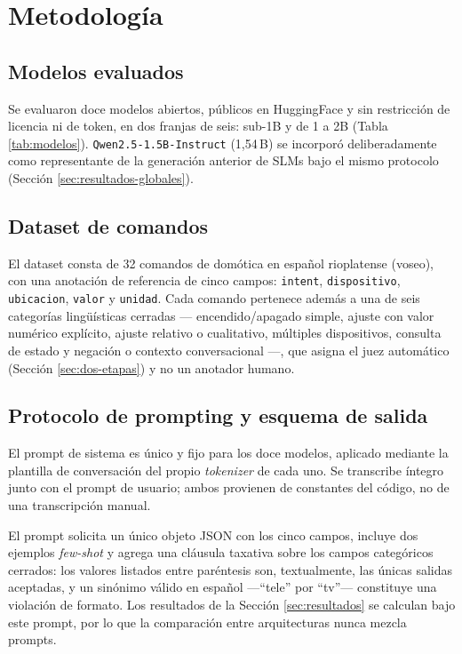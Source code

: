 \section{Metodología}

\subsection{Modelos evaluados}



Se evaluaron doce modelos abiertos, públicos en HuggingFace y sin
restricción de licencia ni de token, en dos franjas de seis: sub-1B y de 1
a 2B (Tabla
\ref{tab:modelos}). \texttt{Qwen2.5-1.5B-Instruct} (1,54\,B) se incorporó
deliberadamente como representante de la generación anterior de SLMs bajo el
mismo protocolo (Sección \ref{sec:resultados-globales}).

\subsection{Dataset de comandos}

El dataset consta de 32 comandos de domótica en español rioplatense (voseo),
con una anotación de referencia de cinco campos: \texttt{intent},
\texttt{dispositivo}, \texttt{ubicacion}, \texttt{valor} y \texttt{unidad}.
Cada comando pertenece además a una de seis categorías lingüísticas cerradas
— encendido/apagado simple, ajuste con valor numérico explícito, ajuste
relativo o cualitativo, múltiples dispositivos, consulta de estado y negación
o contexto conversacional —, que asigna el juez automático (Sección
\ref{sec:dos-etapas}) y no un anotador humano.

\subsection{Protocolo de prompting y esquema de salida}
\label{sec:prompting}

El prompt de sistema es único y fijo para los doce modelos, aplicado
mediante la plantilla de conversación del propio \emph{tokenizer} de cada
uno. Se transcribe íntegro junto con el prompt de usuario; ambos provienen
de constantes del código, no de una transcripción manual.



El prompt solicita un único objeto JSON con los cinco campos, incluye dos
ejemplos \emph{few-shot} y agrega una cláusula taxativa sobre los campos
categóricos cerrados: los valores listados entre paréntesis son,
textualmente, las únicas salidas aceptadas, y un sinónimo válido en español
—``tele'' por ``tv''— constituye una violación de formato. Los resultados de
la Sección \ref{sec:resultados} se calculan bajo este prompt, por lo que la comparación entre
arquitecturas nunca mezcla prompts.

